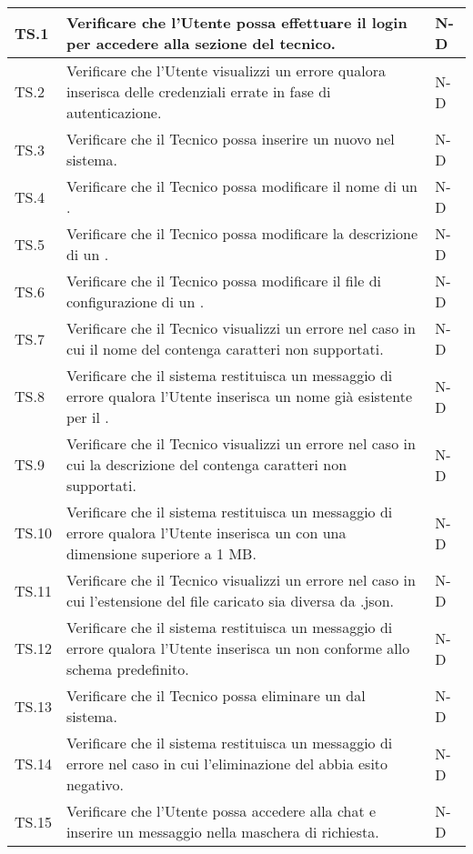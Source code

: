 \begin{adjustwidth}{-0.5cm}{-0.5cm}
\begin{longtable}{|P{1.5cm}|>{\raggedright}P{9.5cm}|>{\arraybackslash}P{1.5cm}|}
		TS.1 & Verificare che l'Utente possa effettuare il login per accedere alla sezione del tecnico. & N-D \\
		\hline TS.2 & Verificare che l'Utente visualizzi un errore qualora inserisca delle credenziali errate in fase di autenticazione. & N-D \\
		\hline TS.3 & Verificare che il Tecnico possa inserire un nuovo  nel sistema. & N-D \\ 
		\hline TS.4 & Verificare che il Tecnico possa modificare il nome di un . & N-D \\ 
		\hline TS.5 & Verificare che il Tecnico possa modificare la descrizione di un . & N-D \\
		\hline TS.6 & Verificare che il Tecnico possa modificare il file di configurazione di un . & N-D \\
		\hline TS.7 & Verificare che il Tecnico visualizzi un errore nel caso in cui il nome del  contenga caratteri non supportati. & N-D \\ 
		\hline TS.8 & Verificare che il sistema restituisca un messaggio di errore qualora l'Utente inserisca un nome già esistente per il . & N-D \\ 
		\hline TS.9 & Verificare che il Tecnico visualizzi un errore nel caso in cui la descrizione del  contenga caratteri non supportati. & N-D \\ 
		\hline TS.10 & Verificare che il sistema restituisca un messaggio di errore qualora l'Utente inserisca un  con una dimensione superiore a 1 MB. & N-D \\
		\hline TS.11 & Verificare che il Tecnico visualizzi un errore nel caso in cui l'estensione del file caricato sia diversa da .json. & N-D \\ 
		\hline TS.12 & Verificare che il sistema restituisca un messaggio di errore qualora l'Utente inserisca un  non conforme allo schema predefinito. & N-D \\  
		\hline TS.13 & Verificare che il Tecnico possa eliminare un  dal sistema. & N-D \\ 
		\hline TS.14 & Verificare che il sistema restituisca un messaggio di errore nel caso in cui l'eliminazione del  abbia esito negativo. & N-D \\  
		\hline TS.15 & Verificare che l'Utente possa accedere alla chat e inserire un messaggio nella maschera di richiesta. & N-D \\   

\end{longtable}
\end{adjustwidth}
